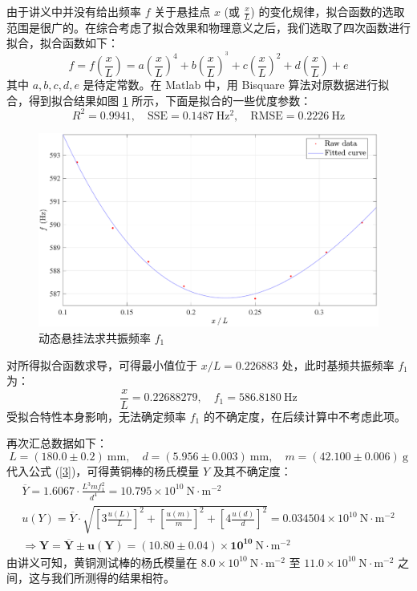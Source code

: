 \documentclass[UTF8]{article}
\theoremstyle{MyLineTheoremStyle} %
\theoremstyle{MyBlockTheoremStyle} %
\theoremstyle{MySubsubsectionStyle} %
\begin{document}
由于讲义中并没有给出频率 $f$ 关于悬挂点 $x$ (或 $\frac{x}{L}$) 的变化规律，拟合函数的选取范围是很广的。在综合考虑了拟合效果和物理意义之后，我们选取了四次函数进行拟合，拟合函数如下：
\begin{equation}
    f = f\left(\frac{x}{L}\right) = a\left(\frac{x}{L}\right)^4 + b\left(\frac{x}{L}\right)^^3 + c\left(\frac{x}{L}\right)^2 + d\left(\frac{x}{L}\right) + e 
\end{equation}
其中 $a, b, c, d, e$ 是待定常数。在 Matlab 中，用 Bisquare 算法对原数据进行拟合，得到拟合结果如图 \ref{动态悬挂法求共振频率} 所示，下面是拟合的一些优度参数：
\begin{equation}
R^2 = 0.9941,\quad  \text{SSE} = 0.1487 \ \mathrm{Hz^2},\quad \text{RMSE} = 0.2226 \ \mathrm{Hz}
\end{equation}
\begin{figure}[H]\centering
    \includegraphics[width=0.9\columnwidth]{assets/3 动态/2024-11-13_00-42-44.pdf}
    \caption{动态悬挂法求共振频率 $f_1$}\label{动态悬挂法求共振频率}
\end{figure}
对所得拟合函数求导，可得最小值位于 $x / L = 0.226883$ 处，此时基频共振频率 $f_1$ 为：
\begin{equation}
    \frac{x}{L} = 0.22688279,\quad f_1 = 586.8180 \ \mathrm{Hz}
\end{equation}
受拟合特性本身影响，无法确定频率 $f_1$ 的不确定度，在后续计算中不考虑此项。

再次汇总数据如下：
\begin{equation}
    L = (180.0 \pm 0.2) \ \mathrm{mm},\quad d = (5.956 \pm 0.003) \ \mathrm{mm},\quad m = (42.100 \pm 0.006) \ \mathrm{g}
\end{equation}
代入公式 (\ref{3})，可得黄铜棒的杨氏模量 $Y$ 及其不确定度： 
\begin{gather}
    \overline{Y} = 1.6067 \cdot \frac{L^3 m f_1^2}{d^4} = 10.795 \times 10^{10} \ \mathrm{N\cdot m^{-2}} \\ 
    u(Y) = \overline{Y}\cdot \sqrt{
    \left[ 3 \frac{u(L)}{L} \right]^2 + 
    \left[ \frac{u(m)}{m} \right]^2 + 
    \left[ 4 \frac{u(d)}{d} \right]^2} = 0.034504 \times 10^{10} \ \mathrm{N\cdot m^{-2}} \\
\Longrightarrow \boldsymbol{
    Y = \overline{Y} \pm u(Y) = (10.80 \pm 0.04) \times 10^{10} \ \mathrm{N\cdot m^{-2}}
}
\end{gather}
由讲义可知，黄铜测试棒的杨氏模量在 $8.0 \times 10^{10} \ \mathrm{N\cdot m^{-2}} $ 至 $ 11.0 \times 10^{10} \ \mathrm{N\cdot m^{-2}} $ 之间，这与我们所测得的结果相符。
\end{document}

